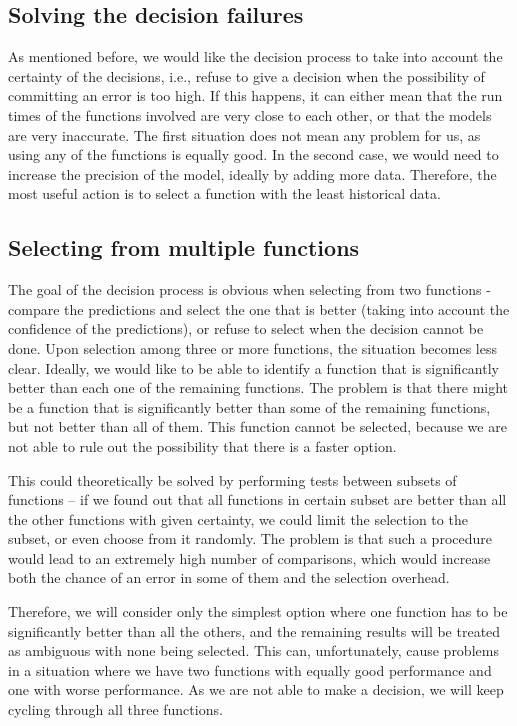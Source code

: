 \subsection{Solving the decision failures}
\label{subsec:solving_decision_failures}

As mentioned before, we would like the decision process to take into account the certainty of the decisions, i.e., refuse to give a decision when the possibility of committing an error is too high. If this happens, it can either mean that the run times of the functions involved are very close to each other, or that the models are very inaccurate. The first situation does not mean any problem for us, as using any of the functions is equally good. In the second case, we would need to increase the precision of the model, ideally by adding more data. Therefore, the most useful action is to select a function with the least historical data. 

\subsection{Selecting from multiple functions}
\label{subsec:selecting_multiple_function}

The goal of the decision process is obvious when selecting from two functions - compare the predictions and select the one that is better (taking into account the confidence of the predictions), or refuse to select when the decision cannot be done. Upon selection among three or more functions, the situation becomes less clear. Ideally, we would like to be able to identify a function that is significantly better than each one of the remaining functions. The problem is that there might be a function that is significantly better than some of the remaining functions, but not better than all of them. This function cannot be selected, because we are not able to rule out the possibility that there is a faster option.

This could theoretically be solved by performing tests between subsets of functions -- if we found out that all functions in certain subset are better than all the other functions with given certainty, we could limit the selection to the subset, or even choose from it randomly. The problem is that such a procedure would lead to an extremely high number of comparisons, which would increase both the chance of an error in some of them and the selection overhead.

Therefore, we will consider only the simplest option where one function has to be significantly better than all the others, and the remaining results will be treated as ambiguous with none being selected. This can, unfortunately, cause problems in a situation where we have two functions with equally good performance and one with worse performance. As we are not able to make a decision, we will keep cycling through all three functions.

